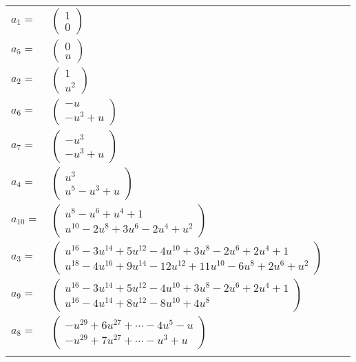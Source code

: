\documentclass[1p]{elsarticle_modified}
\theoremstyle{definition}
\begin{document}
\begin{tabular}{m{7pt} m{180pt} m{7pt} m{180pt} }
\flushright $a_{1}=$&$\begin{pmatrix}1\\0\end{pmatrix}$ \\
\flushright $a_{5}=$&$\begin{pmatrix}0\\u\end{pmatrix}$ \\
\flushright $a_{2}=$&$\begin{pmatrix}1\\u^2\end{pmatrix}$ \\
\flushright $a_{6}=$&$\begin{pmatrix}- u\\- u^3+u\end{pmatrix}$ \\
\flushright $a_{7}=$&$\begin{pmatrix}- u^3\\- u^3+u\end{pmatrix}$ \\
\flushright $a_{4}=$&$\begin{pmatrix}u^3\\u^5- u^3+u\end{pmatrix}$ \\
\flushright $a_{10}=$&$\begin{pmatrix}u^8- u^6+u^4+1\\u^{10}-2 u^8+3 u^6-2 u^4+u^2\end{pmatrix}$ \\
\flushright $a_{3}=$&$\begin{pmatrix}u^{16}-3 u^{14}+5 u^{12}-4 u^{10}+3 u^8-2 u^6+2 u^4+1\\u^{18}-4 u^{16}+9 u^{14}-12 u^{12}+11 u^{10}-6 u^8+2 u^6+u^2\end{pmatrix}$ \\
\flushright $a_{9}=$&$\begin{pmatrix}u^{16}-3 u^{14}+5 u^{12}-4 u^{10}+3 u^8-2 u^6+2 u^4+1\\u^{16}-4 u^{14}+8 u^{12}-8 u^{10}+4 u^8\end{pmatrix}$ \\
\flushright $a_{8}=$&$\begin{pmatrix}- u^{29}+6 u^{27}+\cdots-4 u^5- u\\- u^{29}+7 u^{27}+\cdots- u^3+u\end{pmatrix}$\\&\end{tabular}
\end{document}
